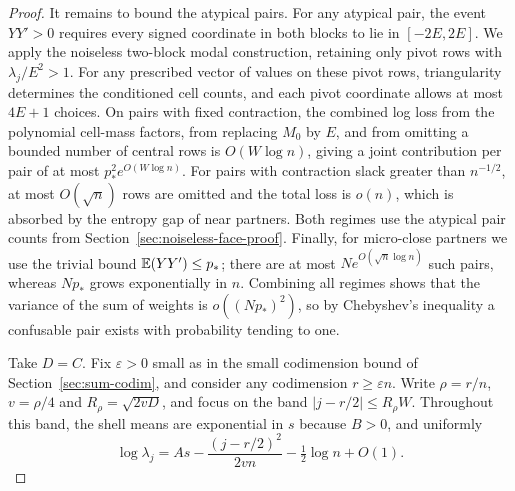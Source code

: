 \begin{proof}
It remains to bound the atypical pairs. For any atypical pair, the event \(YY'>0\) requires every signed coordinate in both blocks to lie in \([-2E,2E]\). We apply the noiseless two-block modal construction, retaining only pivot rows with \(\lambda_j/E^2>1\). For any prescribed vector of values on these pivot rows, triangularity determines the conditioned cell counts, and each pivot coordinate allows at most \(4E+1\) choices. On pairs with fixed contraction, the combined log loss from the polynomial cell-mass factors, from replacing \(M_0\) by \(E\), and from omitting a bounded number of central rows is \(O(W\log n)\), giving a joint contribution per pair of at most \(p_*^2 e^{O(W\log n)}\). For pairs with contraction slack greater than \(n^{-1/2}\), at most \(O(\sqrt n)\) rows are omitted and the total loss is \(o(n)\), which is absorbed by the entropy gap of near partners. Both regimes use the atypical pair counts from Section~\ref{sec:noiseless-face-proof}. Finally, for micro-close partners we use the trivial bound \(\mathbb E(YY')\le p_*\); there are at most \(Ne^{O(\sqrt n\log n)}\) such pairs, whereas \(Np_*\) grows exponentially in \(n\). Combining all regimes shows that the variance of the sum of weights is \(o((Np_*)^2)\), so by Chebyshev's inequality a confusable pair exists with probability tending to one.

Take \(D=C\). Fix \(\varepsilon>0\) small as in the small codimension bound of Section~\ref{sec:sum-codim}, and consider any codimension \(r\ge\varepsilon n\). Write \(\rho=r/n\), \(v=\rho/4\) and \(R_\rho=\sqrt{2vD}\), and focus on the band \(|j-r/2|\le R_\rho W\). Throughout this band, the shell means are exponential in \(s\) because \(B>0\), and uniformly
\[
 \log\lambda_j=As-\frac{(j-r/2)^2}{2vn}-\tfrac12\log n+O(1).
\]


\end{proof}

